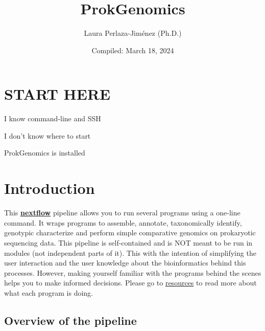\documentclass[
]{book}
\title{ProkGenomics}
\author{Laura Perlaza-Jiménez (Ph.D.)}
\date{Compiled: March 18, 2024}
\begin{document}
\maketitle

{
\setcounter{tocdepth}{1}
\tableofcontents
}
\hypertarget{start-here}{%
\chapter{START HERE}\label{start-here}}

{I know command-line and SSH}

{I don't know where to start}

{ProkGenomics is installed}

\hypertarget{introduction}{%
\chapter{Introduction}\label{introduction}}

This \textbf{\href{https://www.nextflow.io/}{nextflow}} pipeline allows you to run several programs using a one-line command. It wraps programs to assemble, annotate, taxonomically identify, genotypic characterize and perform simple comparative genomics on prokaryotic sequencing data. This pipeline is self-contained and is NOT meant to be run in modules (not independent parts of it). This with the intention of simplifying the user interaction and the user knowledge about the bioinformatics behind this processes. However, making yourself familiar with the programs behind the scenes helps you to make informed decisions. Please go to \href{resources.html}{resources} to read more about what each program is doing.

\hypertarget{overview-of-the-pipeline}{%
\section{Overview of the pipeline}\label{overview-of-the-pipeline}}
\end{document}
